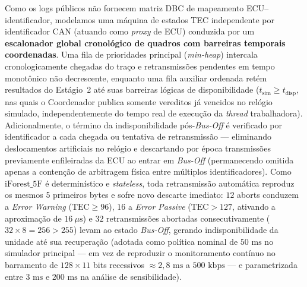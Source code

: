 \documentclass[conference]{IEEEtran}
\begin{document}
Como os logs públicos não fornecem matriz DBC de mapeamento ECU--identificador, modelamos uma máquina de estados TEC independente por identificador CAN (atuando como \textit{proxy} de ECU) conduzida por um \textbf{escalonador global cronológico de quadros com barreiras temporais coordenadas}. Uma fila de prioridades principal (\textit{min-heap}) intercala cronologicamente chegadas do traço e retransmissões pendentes em tempo monotônico não decrescente, enquanto uma fila auxiliar ordenada retém resultados do Estágio~2 até suas barreiras lógicas de disponibilidade ($t_{\text{sim}} \ge t_{\text{disp}}$, nas quais o Coordenador publica somente vereditos já vencidos no relógio simulado, independentemente do tempo real de execução da \textit{thread} trabalhadora). Adicionalmente, o término da indisponibilidade pós-\textit{Bus-Off} é verificado por identificador a cada chegada ou tentativa de retransmissão — eliminando deslocamentos artificiais no relógio e descartando por época transmissões previamente enfileiradas da ECU ao entrar em \textit{Bus-Off} (permanecendo omitida apenas a contenção de arbitragem física entre múltiplos identificadores). Como $\text{iForest\_5F}$ é determinístico e \textit{stateless}, toda retransmissão automática reproduz os mesmos 5 primeiros bytes e sofre novo descarte imediato: $12$ aborts conduzem a \textit{Error Warning} ($\text{TEC} \ge 96$), $16$ a \textit{Error Passive} ($\text{TEC} > 127$, ativando a aproximação de $16~\mu\text{s}$) e $32$ retransmissões abortadas consecutivamente ($32 \times 8 = 256 > 255$) levam ao estado \textit{Bus-Off}, gerando indisponibilidade da unidade até sua recuperação (adotada como política nominal de $50\text{ ms}$ no simulador principal — em vez de reproduzir o monitoramento contínuo no barramento de $128 \times 11$ bits recessivos $\approx 2{,}8\text{ ms}$ a $500\text{ kbps}$ — e parametrizada entre $3\text{ ms}$ e $200\text{ ms}$ na análise de sensibilidade).
\end{document}
